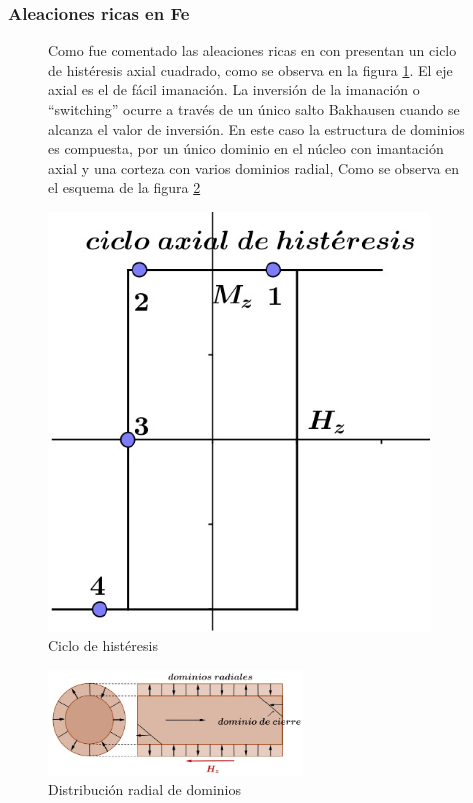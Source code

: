 \subsubsection{Aleaciones ricas en Fe}

\begin{figure}[H]
  \begin{minipage}[b]{0.47\textwidth}
  Como fue comentado las aleaciones ricas en con presentan un ciclo de histéresis axial cuadrado, como se observa en la figura \ref{fig:310}. El eje axial es el de fácil imanación. La inversión de la imanación o “switching” ocurre a través de un único salto Bakhausen cuando se alcanza el valor de inversión. En este caso la estructura de dominios es compuesta, por un único dominio en el núcleo con imantación axial y una corteza con varios dominios radial, Como se observa en el esquema de la figura \ref{fig:311}
  \vspace{1cm}
  \end{minipage}
  \hfill
  \begin{minipage}[b]{0.47\textwidth}
     \includegraphics[width=0.9\textwidth]{./Figures/fig310}
     \caption{Ciclo de histéresis}
	\label{fig:310}
  \end{minipage}
\end{figure}

\begin{figure}[H]
    \centering
    \includegraphics[width=0.6\textwidth]{./Figures/fig311}
	\caption{Distribución radial de dominios}
	\label{fig:311}    
\end{figure}




